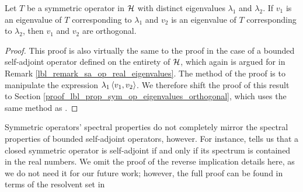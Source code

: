 \begin{proposition}\label{lbl_prop_sym_op_eigenvalues_orthogonal}
  Let $T$ be a symmetric operator in $\mathcal{H}$ with distinct eigenvalues $\lambda_1$ and $\lambda_2$. If $v_1$ is an eigenvalue of $T$ corresponding to $\lambda_1$ and $v_2$ is an eigenvalue of $T$ corresponding to $\lambda_2$, then $v_1$ and $v_2$ are orthogonal.
\end{proposition}
\begin{proof}
  This proof is also virtually the same to the proof in the case of a bounded self-adjoint operator defined on the entirety of $\mathcal{H}$, which again is argued for in Remark \eqref{lbl_remark_sa_op_real_eigenvalues}. The method of the proof is to manipulate the expression $\lambda_1\left\langle v_1, v_2\right\rangle$. We therefore shift the proof of this result to Section \eqref{proof_lbl_prop_sym_op_eigenvalues_orthogonal}, which uses the same method as {\cite[Chapter 41, Theorem 3]{glazman}}.
\end{proof}

Symmetric operators' spectral properties do not completely mirror the spectral properties of bounded self-adjoint operators, however. For instance, {\cite[Corollary 3.14]{konrad}} tells us that a closed symmetric operator is self-adjoint if and only if its spectrum is contained in the real numbers. We omit the proof of the reverse implication details here, as we do not need it for our future work; however, the full proof can be found in terms of the resolvent set in {\cite[Proposition 3.13]{konrad}}

